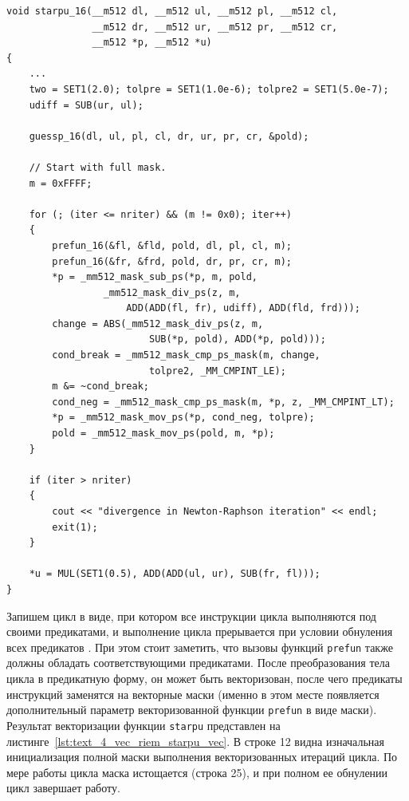 \begin{lstlisting}[caption={Векторизованная версия функции \texttt{starpu}.},label={lst:text_4_vec_riem_starpu_vec}]
void starpu_16(__m512 dl, __m512 ul, __m512 pl, __m512 cl,
               __m512 dr, __m512 ur, __m512 pr, __m512 cr,
               __m512 *p, __m512 *u)
{
    ...
    two = SET1(2.0); tolpre = SET1(1.0e-6); tolpre2 = SET1(5.0e-7);
    udiff = SUB(ur, ul);

    guessp_16(dl, ul, pl, cl, dr, ur, pr, cr, &pold);

    // Start with full mask.
    m = 0xFFFF;

    for (; (iter <= nriter) && (m != 0x0); iter++)
    {
        prefun_16(&fl, &fld, pold, dl, pl, cl, m);
        prefun_16(&fr, &frd, pold, dr, pr, cr, m);
        *p = _mm512_mask_sub_ps(*p, m, pold,
                 _mm512_mask_div_ps(z, m,
                     ADD(ADD(fl, fr), udiff), ADD(fld, frd)));
        change = ABS(_mm512_mask_div_ps(z, m,
                         SUB(*p, pold), ADD(*p, pold)));
        cond_break = _mm512_mask_cmp_ps_mask(m, change,
                         tolpre2, _MM_CMPINT_LE);
        m &= ~cond_break;
        cond_neg = _mm512_mask_cmp_ps_mask(m, *p, z, _MM_CMPINT_LT);
        *p = _mm512_mask_mov_ps(*p, cond_neg, tolpre);
        pold = _mm512_mask_mov_ps(pold, m, *p);
    }

    if (iter > nriter)
    {
        cout << "divergence in Newton-Raphson iteration" << endl;
        exit(1);
    }

    *u = MUL(SET1(0.5), ADD(ADD(ul, ur), SUB(fr, fl)));
}
\end{lstlisting}

Запишем цикл в виде, при котором все инструкции цикла выполняются под своими предикатами, и выполнение цикла прерывается при условии обнуления всех предикатов \cite{Krzikalla2026Vec}.
При этом стоит заметить, что вызовы функций \texttt{prefun} также должны обладать соответствующими предикатами.
После преобразования тела цикла в предикатную форму, он может быть векторизован, после чего предикаты инструкций заменятся на векторные маски (именно в этом месте появляется дополнительный параметр векторизованной функции \texttt{prefun} в виде маски).
Результат векторизации функции \texttt{starpu} представлен на листинге~\ref{lst:text_4_vec_riem_starpu_vec}.
В строке 12 видна изначальная инициализация полной маски выполнения векторизованных итераций цикла.
По мере работы цикла маска истощается (строка 25), и при полном ее обнулении цикл завершает работу.

